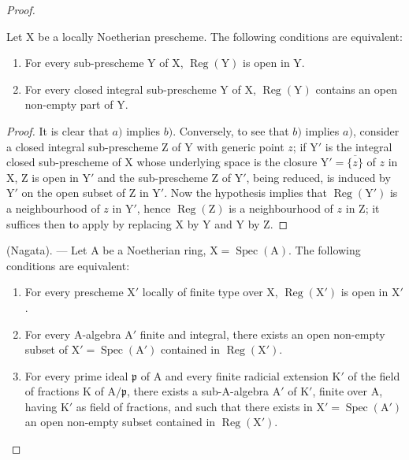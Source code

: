 \begin{proof}
\begin{corollary}[6.12.3]
\label{IV.6.12.3}
Let $\mathrm{X}$ be a locally Noetherian prescheme. The following conditions
are equivalent:
\begin{enumerate}[label=\emph{\alph*)}]
  \item For every sub-prescheme $\mathrm{Y}$ of $\mathrm{X}$, $\operatorname{Reg}(\mathrm{Y})$ is open in $\mathrm{Y}$.
  \item For every closed integral sub-prescheme $\mathrm{Y}$ of $\mathrm{X}$, $\operatorname{Reg}(\mathrm{Y})$ contains an open non-empty
part of $\mathrm{Y}$.
\end{enumerate}
\end{corollary}

\begin{proof}
It is clear that $a)$ implies $b)$. Conversely, to see that $b)$ implies $a)$, consider
a closed integral sub-prescheme $\mathrm{Z}$ of $\mathrm{Y}$ with generic point $z$; if $\mathrm{Y}'$ is the
integral closed sub-prescheme of $\mathrm{X}$ whose underlying space is the closure $\mathrm{Y}'=\overline{\{z\}}$ of $z$
in $\mathrm{X}$, $\mathrm{Z}$ is open in $\mathrm{Y}'$ and the sub-prescheme $\mathrm{Z}$ of $\mathrm{Y}'$, being reduced, is induced by $\mathrm{Y}'$
on the open subset of $\mathrm{Z}$ in $\mathrm{Y}'$. Now the hypothesis implies that $\operatorname{Reg}(\mathrm{Y}')$ is
a neighbourhood of $z$ in $\mathrm{Y}'$, hence $\operatorname{Reg}(\mathrm{Z})$ is a neighbourhood of $z$ in $\mathrm{Z}$; it suffices then
to apply  by replacing $\mathrm{X}$ by $\mathrm{Y}$ and $\mathrm{Y}$ by $\mathrm{Z}$.
\end{proof}

\begin{theorem}[6.12.4]
\label{IV.6.12.4}
\textnormal{(Nagata).} --- Let $\mathrm{A}$ be a Noetherian ring, $\mathrm{X}=\operatorname{Spec}(\mathrm{A})$. The
following conditions are equivalent:
\begin{enumerate}[label=\emph{\alph*)}]
  \item For every prescheme $\mathrm{X}'$ locally of finite type over $\mathrm{X}$, $\operatorname{Reg}(\mathrm{X}')$ is open in $\mathrm{X}'$.
  \item For every $\mathrm{A}$-algebra $\mathrm{A}'$ finite and integral, there exists an open non-empty subset of
$\mathrm{X}'=\operatorname{Spec}(\mathrm{A}')$ contained in $\operatorname{Reg}(\mathrm{X}')$.
  \item For every prime ideal $\mathfrak{p}$ of $\mathrm{A}$ and every finite radicial extension $\mathrm{K}'$ of the field of fractions $\mathrm{K}$
of $\mathrm{A}/\mathfrak{p}$, there exists a sub-$\mathrm{A}$-algebra $\mathrm{A}'$ of $\mathrm{K}'$, finite over $\mathrm{A}$, having $\mathrm{K}'$ as field of fractions, and
such that there exists in $\mathrm{X}'=\operatorname{Spec}(\mathrm{A}')$ an open non-empty subset contained in $\operatorname{Reg}(\mathrm{X}')$.
\end{enumerate}
\end{theorem}


\end{proof}
